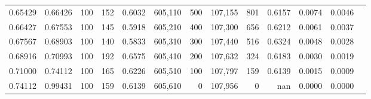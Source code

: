 \begin{tabular}{rrrrrrrrrrrrr}
0.65429 & 0.66426 &   100 & 152 &                                     0.6032 & 605,110 &     500 & 107,155 &     801 & 0.6157 & 0.0074 & 0.0046 \\
0.66427 & 0.67553 &   100 & 145 &                                     0.5918 & 605,210 &     400 & 107,300 &     656 & 0.6212 & 0.0061 & 0.0037 \\
0.67567 & 0.68903 &   100 & 140 &                                     0.5833 & 605,310 &     300 & 107,440 &     516 & 0.6324 & 0.0048 & 0.0028 \\
0.68916 & 0.70993 &   100 & 192 &                                     0.6575 & 605,410 &     200 & 107,632 &     324 & 0.6183 & 0.0030 & 0.0019 \\
0.71000 & 0.74112 &   100 & 165 &                                     0.6226 & 605,510 &     100 & 107,797 &     159 & 0.6139 & 0.0015 & 0.0009 \\
0.74112 & 0.99431 &   100 & 159 &                                     0.6139 & 605,610 &       0 & 107,956 &       0 &    nan & 0.0000 & 0.0000 \\
\bottomrule
\end{tabular}
